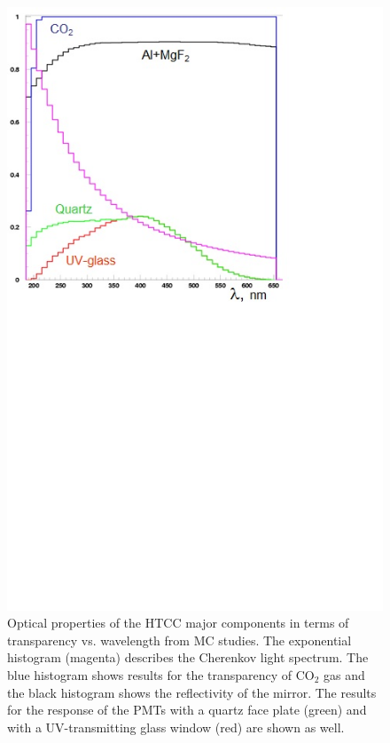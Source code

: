 \begin{figure}[!ht]
    \centering
    \includegraphics[width=1.0\linewidth,trim={0.0cm 10.7cm 3.7cm 0.1cm},clip]{images/PROPERTIES.jpg}
    \caption{Optical properties of the HTCC major components in terms of transparency vs. wavelength from MC
      studies. The exponential histogram (magenta) describes the Cherenkov light spectrum. The blue histogram
      shows results for the transparency of CO$_2$ gas and the black histogram shows the reflectivity of the mirror.
      The results for the response of the PMTs with a quartz face plate (green) and with a UV-transmitting glass
      window (red) are shown as well.} 
    \label{fig:PROPERTIES}
\end{figure}

